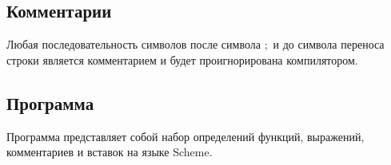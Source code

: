     \subsection{Комментарии}
        Любая последовательность символов после символа $;$ и до символа переноса строки является комментарием и будет проигнорирована компилятором.

        

    \subsection{Программа}
        Программа представляет собой набор определений функций, выражений, комментариев и вставок на языке Scheme.

        
